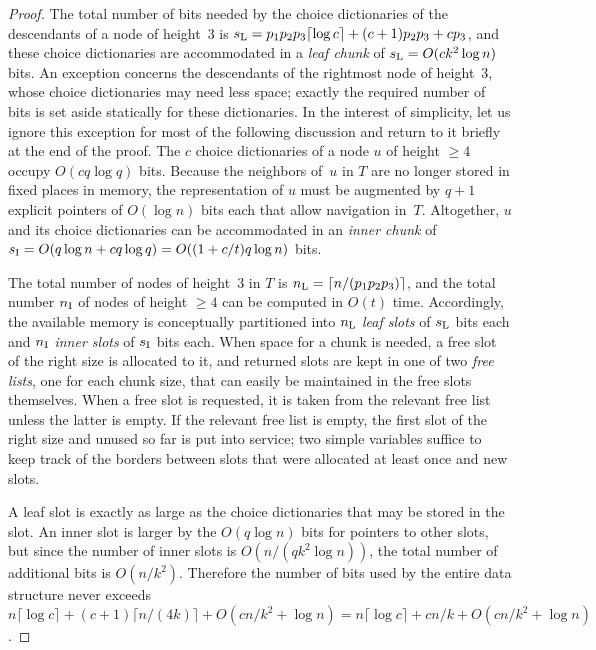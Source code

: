 \documentclass[envcountsame,envcountsect,undated,nolinenumbers]{lnthi}
\def\Tceil#1{\lceil #1\rceil}
\begin{document}
\begin{proof}
The total number of bits needed by the choice dictionaries
of the descendants of a node of height~3
is $s\Tsub L=p_1 p_2 p_3\Tceil{\log c}+(c+1)p_2 p_3+c p_3$,
and these choice dictionaries are accommodated in
a \emph{leaf chunk} of $s_{\mbox{\scriptsize L}}=O(c k^2\log n)$ bits.
An exception concerns the descendants of
the rightmost node of height~3,
whose choice dictionaries may need less space;
exactly the required number of bits
is set aside statically for these dictionaries.
In the interest of simplicity, let us ignore
this exception for most of the following
discussion and return to it briefly at the end of the proof.
The $c$ choice dictionaries of a node $u$ of height $\ge 4$
occupy $O(c q\log q)$ bits.
Because the neighbors of~$u$ in $T$ are no longer
stored in fixed places in memory, the representation
of $u$ must be augmented by $q+1$ explicit pointers
of $O(\log n)$ bits each that allow
navigation in~$T$.
Altogether, $u$ and its choice dictionaries can be
accommodated in an \emph{inner chunk} of
$s_{\mbox{\scriptsize I}}=O(q\log n+c q\log q)=
O((1+{c/t})q\log n)$ bits.

The total number of nodes of height~3 in $T$
is $n\Tsub L=\Tceil{n/{(p_1 p_2 p_3)}}$, and
the total number $n_{\mbox{\scriptsize I}}$ of nodes of height
$\ge 4$ can be computed in $O(t)$ time.
Accordingly, the available memory is conceptually
partitioned into $n_{\mbox{\scriptsize L}}$ \emph{leaf slots}
of $s_{\mbox{\scriptsize L}}$ bits each
and $n_{\mbox{\scriptsize I}}$ \emph{inner slots}
of $s_{\mbox{\scriptsize I}}$ bits each.
When space for a chunk is needed, a free slot of
the right size is allocated to it, and returned
slots are kept in one of two \emph{free lists},
one for each chunk size, that can
easily be maintained in the free slots themselves.
When a free slot is requested, it is taken from
the relevant free list unless the latter is empty.
If the relevant free list is empty, the first
slot of the right size and
unused so far is put into service; two
simple variables suffice to keep track of the
borders between slots that were allocated at least
once and new slots.

A leaf slot is exactly as large as the choice dictionaries
that may be stored in the slot.
An inner slot is larger by the $O(q\log n)$ bits
for pointers to other slots, but since the number
of inner slots is $O({n/{(q k^2\log n)}})$,
the total number of
additional bits is $O({n/{k^2}})$.
Therefore the number of bits used by the entire
data structure never exceeds
$n\Tceil{\log c}+(c+1)\Tceil{n/{(4 k)}}+O({{c n}/{k^2}}+\log n)
=n\Tceil{\log c}+{{c n}/k}+O({{c n}/{k^2}}+\log n)$.


\end{proof}
\end{document}
